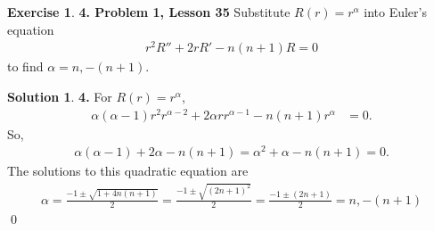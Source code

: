 \documentclass{book}
\theoremstyle{definition}
\newtheorem*{exer*}{Exercise}
\newtheorem*{sln*}{Solution}
\newcommand{\f}[2]{\frac{#1}{#2}}
\begin{document}
\begin{exer*}\textbf{4. Problem 1, Lesson 35} 
	Substitute $R(r) =r^\alpha$ into Euler's equation
	\begin{align*}
	r^2 R'' + 2rR' -n(n+1)R = 0
	\end{align*}
	to find $\alpha = n, -(n+1)$.
	
	\begin{sln*}\textbf{4. } For $R(r) = r^\alpha$,
		\begin{align*}
		\alpha (\alpha - 1) r^2 r^{\alpha-2} + 2\alpha r r^{\alpha-1} -n(n+1)r^{\alpha} &= 0.
		\end{align*}
		So,
		\begin{align*}
		\alpha (\alpha - 1) +  2\alpha-n(n+1) = \alpha^2 + \alpha - n(n+1) =  0.
		\end{align*}
		The solutions to this quadratic equation are
		\begin{align*}
		\alpha = \f{-1 \pm \sqrt{1 + 4n(n+1)}}{2} = \f{-1 \pm \sqrt{(2n+1)^2}}{2} = \f{-1 \pm (2n+1)}{2} = \boxed{n, -(n+1)}
		\end{align*}\qed
	\end{sln*}
	
\end{exer*}
\newpage
\end{document}

